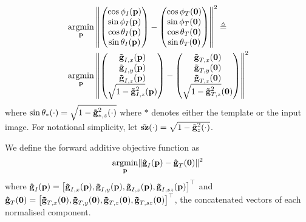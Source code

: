 \begin{equation}
    \begin{aligned}\label{eq:argmin_spherical}
        &\argmin_{\p} \left\lVert
            \begin{pmatrix}
                \cos{\phi_I}(\p) \\
                \sin{\phi_I}(\p) \\
                \cos{\theta_I}(\p) \\
                \sin{\theta_I}(\p)
            \end{pmatrix}
            -
            \begin{pmatrix}
                \cos{\phi_T}(\zero) \\
                \sin{\phi_T}(\zero) \\
                \cos{\theta_T}(\zero) \\
                \sin{\theta_T}(\zero)
            \end{pmatrix}
            \right\lVert^2 \triangleq \\
        &\argmin_{\p} \left\lVert
            \begin{pmatrix}
                \bb{\tilde{g}}_{I,x}(\p) \\ 
                \bb{\tilde{g}}_{I,y}(\p) \\ 
                \bb{\tilde{g}}_{I,z}(\p) \\ 
                \sqrt{1 - \bb{\tilde{g}}_{I,z}^2}(\p)
            \end{pmatrix}
            -
            \begin{pmatrix}
                \bb{\tilde{g}}_{T,x}(\zero) \\ 
                \bb{\tilde{g}}_{T,y}(\zero) \\ 
                \bb{\tilde{g}}_{T,z}(\zero) \\ 
                \sqrt{1 - \bb{\tilde{g}}_{T,z}^2}(\zero)
            \end{pmatrix}
            \right\lVert^2
    \end{aligned}
\end{equation}
where $\sin{\theta_{\ast}}(\cdot) = \sqrt{1 - {\boldsymbol{\mathbf{\tilde{g}}}_{\ast,z}^2}(\cdot)}$
where $\ast$ denotes either the template or the input image. For notational
simplicity, let $\boldsymbol{\mathbf{\tilde{sz}}}(\cdot) = \sqrt{1 - {\boldsymbol{\mathbf{\tilde{g}}}_{z}^2}(\cdot)}$.

We define the forward additive objective function as
\begin{equation}\label{eq:spher-ssd}
    \argmin_{\p} \norm{\bb{\hat{g}}_I(\p) - \bb{\hat{g}}_T(\zero)}^2
\end{equation}
where $\boldsymbol{\mathbf{\hat{g}}}_I(\boldsymbol{\mathbf{p}}) = {\left[  \boldsymbol{\mathbf{\tilde{g}}}_{I,x}(\boldsymbol{\mathbf{p}}),
\boldsymbol{\mathbf{\tilde{g}}}_{I,y}(\boldsymbol{\mathbf{p}}), \boldsymbol{\mathbf{\tilde{g}}}_{I,z}(\boldsymbol{\mathbf{p}}),
\boldsymbol{\mathbf{\tilde{g}}}_{I,sz}(\boldsymbol{\mathbf{p}}) \right]}^{\top}$ and $\boldsymbol{\mathbf{\hat{g}}}_T(\boldsymbol{\mathbf{0}}) =
{\left[ \boldsymbol{\mathbf{\tilde{g}}}_{T,x}(\boldsymbol{\mathbf{0}}), \boldsymbol{\mathbf{\tilde{g}}}_{T,y}(\boldsymbol{\mathbf{0}}),
\boldsymbol{\mathbf{\tilde{g}}}_{T,z}(\boldsymbol{\mathbf{0}}), \boldsymbol{\mathbf{\tilde{g}}}_{T,sz}(\boldsymbol{\mathbf{0}})
\right]}^{\top}$, the concatenated vectors of each normalised component.

